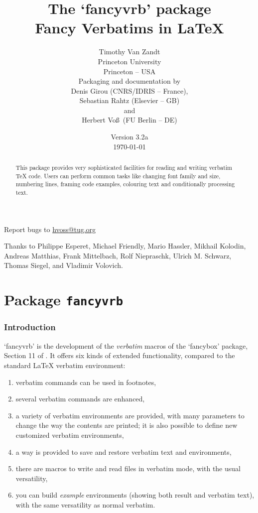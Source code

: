 \documentclass{article}
\title{The `\textsf{fancyvrb}' package\\Fancy Verbatims in \LaTeX}
\author{Timothy Van Zandt\\Princeton University\\Princeton -- USA\\[5mm]
        {Packaging and documentation by}\\
        {\footnotesize Denis Girou (CNRS/IDRIS -- France),}\\[-2mm]
        {\footnotesize Sebastian Rahtz (Elsevier -- GB)}\\[-2mm]
        {\footnotesize and}\\[-2mm]
        {\footnotesize Herbert Voß\ (FU Berlin -- DE)}
        }
\date{Version 3.2a\\ \today}
\newcommand\FBoxPackage{`\textsf{fancybox}'}
\newcommand\FVrbPackage{`\textsf{fancyvrb}'}
\begin{document}
\maketitle
%
\begin{abstract}
    This package provides very sophisticated facilities for reading and
  writing verbatim \TeX{} code. Users can perform common tasks like changing
  font family and size, numbering lines, framing code examples, colouring
  text and conditionally processing text.
\end{abstract}

\begin{center}
Report bugs to \url{hvoss@tug.org}
\end{center}

\vfill
Thanks to 
Philippe Esperet, %
Michael Friendly, %
Mario Hassler, %
Mikhail Kolodin, %
Andreas Matthias,
Frank Mittelbach,
Rolf Niepraschk, %
Ulrich M. Schwarz,
Thomas Siegel,%
and 
Vladimir Volovich. %
\clearpage
\tableofcontents
\clearpage


\part{Package \texttt{fancyvrb}}


\section{Introduction}
%
  \FVrbPackage{} is the development of the \emph{verbatim} macros of the
\FBoxPackage{} package,  Section 11 of \cite{FancyBox}. It offers six kinds
of extended functionality, compared to the standard \LaTeX{}
\textsf{verbatim} environment:

\begin{enumerate}
  \item verbatim commands can be used in footnotes,
  \item several verbatim commands are enhanced,
  \item a variety of verbatim environments are provided, with many
  parameters to change the way the contents are printed; it is also possible
  to define new customized verbatim environments,
  \item a way is provided to save and restore verbatim text and environments,
  \item there are macros to write and read files in verbatim mode, with the
  usual versatility,
  \item you can build \emph{example} environments (showing both result and
  verbatim text), with the same versatility as normal verbatim.
\end{enumerate}
\end{document}
